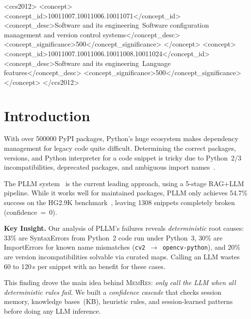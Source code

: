 \documentclass[sigconf,screen]{acmart}
\begin{document}
\begin{CCSXML}
<ccs2012>
 <concept>
  <concept_id>10011007.10011006.10011071</concept_id>
  <concept_desc>Software and its engineering~Software configuration management and version control systems</concept_desc>
  <concept_significance>500</concept_significance>
 </concept>
 <concept>
  <concept_id>10011007.10011006.10011008.10011024</concept_id>
  <concept_desc>Software and its engineering~Language features</concept_desc>
  <concept_significance>500</concept_significance>
 </concept>
</ccs2012>
\end{CCSXML}

\maketitle

\section{Introduction}
\label{sec:intro}

With over \num{500000} PyPI packages, Python's huge ecosystem makes dependency management for legacy code quite difficult.
Determining the correct packages, versions, and Python interpreter for a code snippet is tricky due to Python~2/3 incompatibilities, deprecated packages, and ambiguous import names~\cite{jia2024}.

The PLLM system~\cite{bartlett2025} is the current leading approach, using a 5-stage RAG+LLM pipeline.
While it works well for maintained packages, PLLM only achieves 54.7\% success on the HG2.9K benchmark~\cite{horton2019}, leaving \num{1308} snippets completely broken (confidence~=~0).

\textbf{Key Insight.}
Our analysis of PLLM's failures reveals \emph{deterministic} root causes: 33\% are SyntaxErrors from Python~2 code run under Python~3, 30\% are ImportErrors for known name mismatches (\texttt{cv2}~$\to$~\texttt{opencv-python}), and 20\% are version incompatibilities solvable via curated maps.
Calling an LLM wastes 60 to 120\,s per snippet with no benefit for these cases.

This finding drove the main idea behind \textsc{MemRes}: \emph{only call the LLM when all deterministic rules fail}.
We built a \emph{confidence cascade} that checks session memory, knowledge bases~(KB), heuristic rules, and session-learned patterns before doing any LLM inference.
\end{document}
